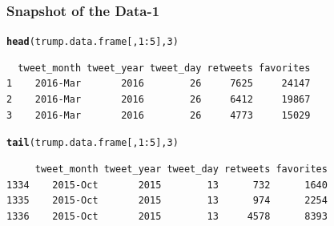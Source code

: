 \documentclass{beamer}\usepackage[]{graphicx}\usepackage[]{color}
\makeatletter
\newcommand{\hlnum}[1]{\textcolor[rgb]{0.2,0.2,0.2}{#1}}%
\newcommand{\hlopt}[1]{\textcolor[rgb]{0.102,0.102,0.102}{#1}}%
\newcommand{\hlstd}[1]{\textcolor[rgb]{0.102,0.102,0.102}{#1}}%
\newcommand{\hlkwd}[1]{\textcolor[rgb]{0.102,0.102,0.102}{\textbf{#1}}}%
\newenvironment{kframe}{%
 \def\at@end@of@kframe{}%
 \ifinner\ifhmode%
  \def\at@end@of@kframe{\end{minipage}}%
  \begin{minipage}{\columnwidth}%
 \fi\fi%
 \def\FrameCommand##1{\hskip\@totalleftmargin \hskip-\fboxsep
 \colorbox{shadecolor}{##1}\hskip-\fboxsep
     \hskip-\linewidth \hskip-\@totalleftmargin \hskip\columnwidth}%
 \MakeFramed {\advance\hsize-\width
   \@totalleftmargin\z@ \linewidth\hsize
   \@setminipage}}%
 {\par\unskip\endMakeFramed%
 \at@end@of@kframe}
\newenvironment{knitrout}{}{} %
\renewenvironment{knitrout}{\begin{spacing}{0.75}\begin{tiny}}{\end{tiny}\end{spacing}}
\makeatother
\begin{document}
\begin{frame}[fragile]
\frametitle{Snapshot of the Data-1}

\begin{knitrout}\small
{}\color{fgcolor}\begin{kframe}
\begin{alltt}
\hlkwd{head}\hlstd{(trump.data.frame[,}\hlnum{1}\hlopt{:}\hlnum{5}\hlstd{],} \hlnum{3}\hlstd{)}
\end{alltt}
\begin{verbatim}
  tweet_month tweet_year tweet_day retweets favorites
1    2016-Mar       2016        26     7625     24147
2    2016-Mar       2016        26     6412     19867
3    2016-Mar       2016        26     4773     15029
\end{verbatim}
\begin{alltt}
\hlkwd{tail}\hlstd{(trump.data.frame[,}\hlnum{1}\hlopt{:}\hlnum{5}\hlstd{],} \hlnum{3}\hlstd{)}
\end{alltt}
\begin{verbatim}
     tweet_month tweet_year tweet_day retweets favorites
1334    2015-Oct       2015        13      732      1640
1335    2015-Oct       2015        13      974      2254
1336    2015-Oct       2015        13     4578      8393
\end{verbatim}
\end{kframe}
\end{knitrout}

\end{frame}
\end{document}
